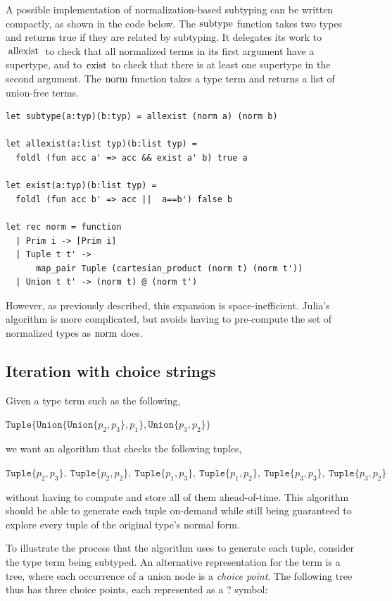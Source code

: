 \documentclass[a4paper,english]{lipics-v2019}
\newcommand{\xt}[1]{\texttt{#1}}
\newcommand{\union}[2]{\xt{Union\{}#1,#2\xt{\}}}
\renewcommand{\c}[1]{\ensuremath{\text{\lstinline{#1}}}\xspace}
\newcommand{\tuple}[1]{\xt{Tuple\{}#1\xt{\}}}
\begin{document}
A possible implementation of normalization-based subtyping can be written
compactly, as shown in the code below.  The \c{subtype} function takes two types and returns true if
they are related by subtyping. It delegates its work to \c{allexist} to
check that all normalized terms in its first argument have a supertype, and
to \c{exist} to check that there is at least one supertype in the second
argument.  The \c{norm} function takes a type term and returns a list of
union-free terms.

\begin{lstlisting}
let subtype(a:typ)(b:typ) = allexist (norm a) (norm b)

let allexist(a:list typ)(b:list typ) = 
  foldl (fun acc a' => acc && exist a' b) true a

let exist(a:typ)(b:list typ) = 
  foldl (fun acc b' => acc ||  a==b') false b

let rec norm = function
  | Prim i -> [Prim i]
  | Tuple t t' -> 
      map_pair Tuple (cartesian_product (norm t) (norm t'))
  | Union t t' -> (norm t) @ (norm t')
\end{lstlisting}

\noindent
However, as previously described, this expansion is space-inefficient. Julia's
algorithm is more complicated, but avoids having to pre-compute the set of normalized
types as \c{norm} does. 


\subsection{Iteration with choice strings}\label{cs}

Given a type term such as the following,

\medskip
$\tuple{ \union{ \union{p_2}{p_3} }{p_1}, \union{p_3}{p_2}}$
\medskip

\noindent
we want an algorithm that checks the following tuples,

\medskip
\noindent $\tuple{p_2,p_3}, ~ \tuple{p_2,p_2}, ~ \tuple{p_1,p_3}, ~ \tuple{p_1,p_2}, ~
  \tuple{p_3,p_3}, ~ \tuple{p_3,p_2}$
\vspace{-1mm}

\noindent
without having to compute and store all of them ahead-of-time. This algorithm
should be able to generate each tuple on-demand while still being guaranteed to 
explore every tuple of the original type's normal form.

To illustrate the process that the algorithm uses to generate each tuple,
consider the type term being subtyped. An alternative representation for the
term is a tree, where each occurrence of a union node is a \emph{choice point}.
The following tree thus has three choice points, each represented as a ?
symbol: 
\medskip
\end{document}
